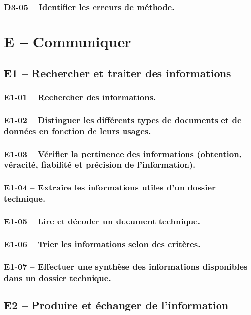 \subsubsection*{D3-05 -- Identifier les erreurs de méthode.}  
\section{E -- Communiquer}  
\subsection{E1 -- Rechercher et traiter des informations}  
\subsubsection*{E1-01 -- Rechercher des informations.}  
\subsubsection*{E1-02 -- Distinguer les différents types de documents et de données en fonction de leurs usages.}  
\subsubsection*{E1-03 -- Vérifier la pertinence des informations (obtention, véracité, fiabilité et précision de l'information).}  
\subsubsection*{E1-04 -- Extraire les informations utiles d’un dossier technique.}  
\subsubsection*{E1-05 -- Lire et décoder un document technique.}  
\subsubsection*{E1-06 -- Trier les informations selon des critères.}  
\subsubsection*{E1-07 -- Effectuer une synthèse des informations disponibles dans un dossier technique.}  
\subsection{E2 -- Produire et échanger de l'information}  
